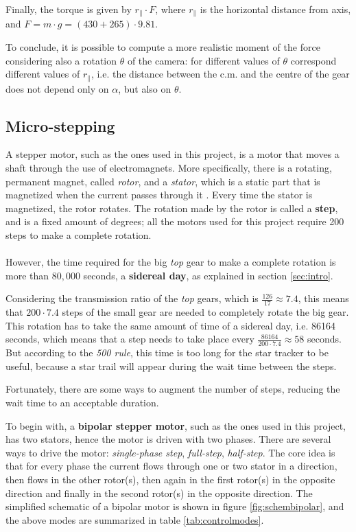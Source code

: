\documentclass[]{article}
\begin{document}
Finally, the torque is given by $r_{\parallel}\cdot F$, where $r_{\parallel}$ is the horizontal distance from axis, and $ F = m\cdot g = (430+265)\cdot9.81 $.

To conclude, it is possible to compute a more realistic moment of the force considering also a rotation $\theta$ of the camera: for different values of $\theta$ correspond different values of $r_{\parallel}$, i.e. the distance between the c.m. and the centre of the gear does not depend only on $\alpha$, but also on $\theta$. 

\subsection{Micro-stepping}

A stepper motor, such as the ones used in this project, is a motor that moves a shaft through the use of electromagnets. More specifically, there is a rotating, permanent magnet, called \textit{rotor}, and a \textit{stator}, which is a static part that is magnetized when the current passes through it \cite{steppermotors}. Every time the stator is magnetized, the rotor rotates. The rotation made by the rotor is called a \textbf{step}, and is a fixed amount of degrees; all the motors used for this project require 200 steps to make a complete rotation.
\\
\\
However, the time required for the big \textit{top} gear to make a complete rotation is more than $80,000$ seconds, a \textbf{sidereal day}, as explained in section \ref{sec:intro}. 

Considering the transmission ratio of the \textit{top} gears, which is $\frac{126}{17} \approx 7.4$, this means that $200 \cdot 7.4 $ steps of the small gear are needed to completely rotate the big gear. This rotation has to take the same amount of time of a sidereal day, i.e. 86164 seconds, which means that a step needs to take place every $\frac{86164}{200\cdot 7.4} \approx 58 $ seconds. But according to the \textit{500 rule}, this time is too long for the star tracker to be useful, because a star trail will appear during the wait time between the steps. 

Fortunately, there are some ways to augment the number of steps, reducing the wait time to an acceptable duration. 

To begin with, a \textbf{bipolar stepper motor}, such as the ones used in this project, has two stators, hence the motor is driven with two phases. There are several ways to drive the motor: \textit{single-phase step}, \textit{full-step}, \textit{half-step}. The core idea is that for every phase the current flows through one or two stator in a direction, then flows in the other rotor(s), then again in the first rotor(s) in the opposite direction and finally in the second rotor(s) in the opposite direction. The simplified schematic of a bipolar motor is shown in figure \ref{fig:schembipolar}, and the above modes are summarized in table \ref{tab:controlmodes}.
\end{document}
